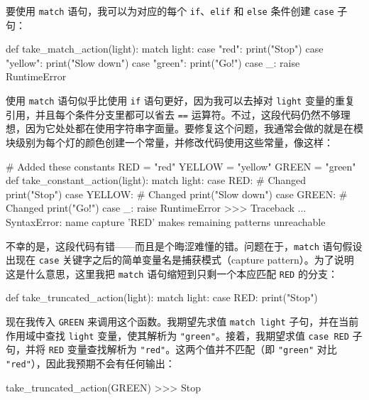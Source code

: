 要使用 \verb|match| 语句，我可以为对应的每个 \verb|if|、\verb|elif| 和 \verb|else| 条件创建 \verb|case| 子句：

\begin{codebox}[python]
def take_match_action(light):
    match light:
        case "red":
            print("Stop")
        case "yellow":
            print("Slow down")
        case "green":
            print("Go!")
        case _:
            raise RuntimeError
\end{codebox}

使用 \verb|match| 语句似乎比使用 \verb|if| 语句更好，因为我可以去掉对 \verb|light| 变量的重复引用，并且每个条件分支里都可以省去 \verb|==| 运算符。不过，这段代码仍然不够理想，因为它处处都在使用字符串字面量。要修复这个问题，我通常会做的就是在模块级别为每个灯的颜色创建一个常量，并修改代码使用这些常量，像这样：

\begin{codebox}[python]
# Added these constants
RED = "red"
YELLOW = "yellow"
GREEN = "green"
def take_constant_action(light):
    match light:
        case RED:               # Changed
            print("Stop")
        case YELLOW:            # Changed
            print("Slow down")
        case GREEN:             # Changed
            print("Go!")
        case _:
            raise RuntimeError
>>>
Traceback ...
SyntaxError: name capture 'RED' makes remaining patterns
unreachable
\end{codebox}

不幸的是，这段代码有错——而且是个晦涩难懂的错。问题在于，\verb|match| 语句假设出现在 \verb|case| 关键字之后的简单变量名是捕获模式（capture pattern）。为了说明这是什么意思，这里我把 \verb|match| 语句缩短到只剩一个本应匹配 \verb|RED| 的分支：

\begin{codebox}[python]
def take_truncated_action(light):
    match light:
        case RED:
            print("Stop")
\end{codebox}

现在我传入 \verb|GREEN| 来调用这个函数。我期望先求值 \verb|match light| 子句，并在当前作用域中查找 \verb|light| 变量，使其解析为 \verb|"green"|。接着，我期望求值 \verb|case RED| 子句，并将 \verb|RED| 变量查找解析为 \verb|"red"|。这两个值并不匹配（即 \verb|"green"| 对比 \verb|"red"|），因此我预期不会有任何输出：

\begin{codebox}[python]
take_truncated_action(GREEN)
>>>
Stop
\end{codebox}

